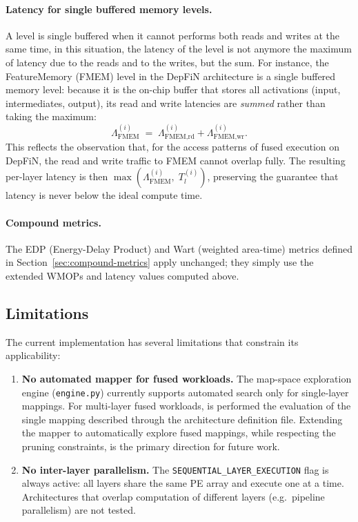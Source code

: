 \paragraph{Latency for single buffered memory levels.}
A level is single buffered when it cannot performs both reads and writes at 
the same time, in this situation, the latency of the level is not anymore the 
maximum of latency due to the reads and to the writes, but the sum. 
For instance, the FeatureMemory (FMEM) level in the DepFiN architecture is
a single buffered memory level: because it is the on-chip buffer that stores
all activations (input, intermediates, output), its read and write
latencies are \emph{summed} rather than taking the maximum:
%
\begin{equation}
\label{eq:ps-fmem-lat}
  \Lambda_{\text{FMEM}}^{(i)} \;=\;
    \Lambda_{\text{FMEM},\text{rd}}^{(i)}
    + \Lambda_{\text{FMEM},\text{wr}}^{(i)}.
\end{equation}
%
\noindent
This reflects the observation that, for the access patterns of fused
execution on DepFiN, the read and write traffic to FMEM cannot overlap
fully.
The resulting per-layer latency is then
$\max(\Lambda_{\text{FMEM}}^{(i)},\; T_l^{(i)})$, preserving the
guarantee that latency is never below the ideal compute time.

\paragraph{Compound metrics.}
The EDP (Energy-Delay Product) and Wart (weighted area-time) metrics
defined in Section~\ref{sec:compound-metrics} apply unchanged; they
simply use the extended WMOPs and latency values computed above.



\subsection{Limitations}
\label{sec:ps-limitations}

The current implementation has several limitations that constrain its
applicability:

\begin{enumerate}
  \item \textbf{No automated mapper for fused workloads.}
        The map-space exploration engine (\texttt{engine.py})
        currently supports automated search only for single-layer
        mappings.
        For multi-layer fused workloads, is performed the evaluation of the single mapping described through the architecture definition file.
        Extending the mapper to automatically explore fused mappings,
        while respecting the pruning constraints, is the
        primary direction for future work.

  \item \textbf{No inter-layer parallelism.}
        The \texttt{SEQUENTIAL\_LAYER\_EXECUTION} flag is always
        active: all layers share the same PE array and execute one at
        a time.
        Architectures that overlap computation of different layers
        (e.g.\ pipeline parallelism) are not tested.
\end{enumerate}

